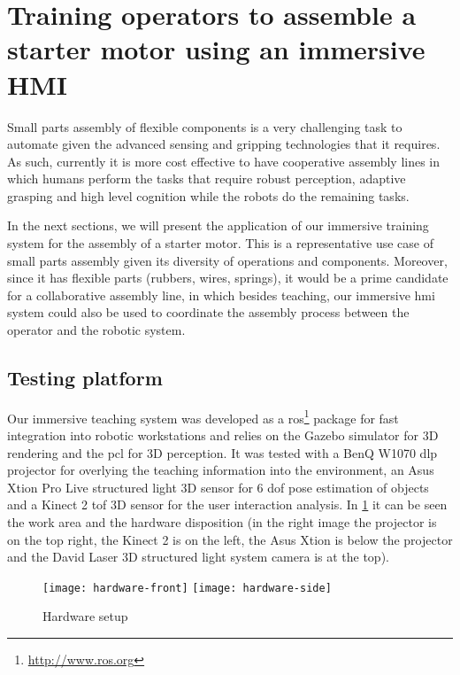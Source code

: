 \section{Training operators to assemble a starter motor using an immersive HMI}\label{sec:training}

Small parts assembly of flexible components is a very challenging task to automate given the advanced sensing and gripping technologies that it requires. As such, currently it is more cost effective to have cooperative assembly lines in which humans perform the tasks that require robust perception, adaptive grasping and high level cognition while the robots do the remaining tasks.

In the next sections, we will present the application of our immersive training system for the assembly of a starter motor. This is a representative use case of small parts assembly given its diversity of operations and components. Moreover, since it has flexible parts (rubbers, wires, springs), it would be a prime candidate for a collaborative assembly line, in which besides teaching, our immersive \gls{hmi} system could also be used to coordinate the assembly process between the operator and the robotic system.



\subsection{Testing platform}

Our immersive teaching system was developed as a \gls{ros}\footnote{\url{http://www.ros.org}} package for fast integration into robotic workstations and relies on the Gazebo simulator for 3D rendering and the \gls{pcl} for 3D perception. It was tested with a BenQ W1070 \gls{dlp} projector for overlying the teaching information into the environment, an Asus Xtion Pro Live structured light 3D sensor for 6 \gls{dof} pose estimation of objects and a Kinect 2 \gls{tof} 3D sensor for the user interaction analysis. In \cref{fig:hardware} it can be seen the work area and the hardware disposition (in the right image the projector is on the top right, the Kinect 2 is on the left, the Asus Xtion is below the projector and the David Laser 3D structured light system camera is at the top).

\begin{figure}[ht]
	\centering
	\texttt{[image: hardware-front]}
	\hspace{2em}
	\texttt{[image: hardware-side]}
	\caption{Hardware setup}
	\label{fig:hardware}
\end{figure}



